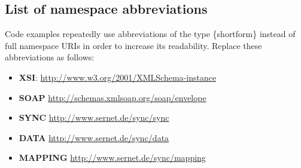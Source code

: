 \documentclass[a4paper,10pt]{book}
\begin{document}
\subsection{ List of namespace abbreviations}
Code examples repeatedly use abbreviations of the type \{shortform\} instead
of full namespace URIs in order to increase its readability. Replace these abbreviations as follows:
\begin{itemize}
 \item \textbf{XSI}: \href{http://www.w3.org/2001/XMLSchema-instance}{http://www.w3.org/2001/XMLSchema-instance}
 \item \textbf{SOAP} \href{http://schemas.xmlsoap.org/soap/envelope}{http://schemas.xmlsoap.org/soap/envelope}
 \item \textbf{SYNC} \href{http://www.sernet.de/sync/sync}{http://www.sernet.de/sync/sync}
 \item \textbf{DATA} \href{http://www.sernet.de/sync/data}{http://www.sernet.de/sync/data}
 \item \textbf{MAPPING} \href{http://www.sernet.de/sync/mapping}{http://www.sernet.de/sync/mapping}
\end{itemize}
\end{document}

